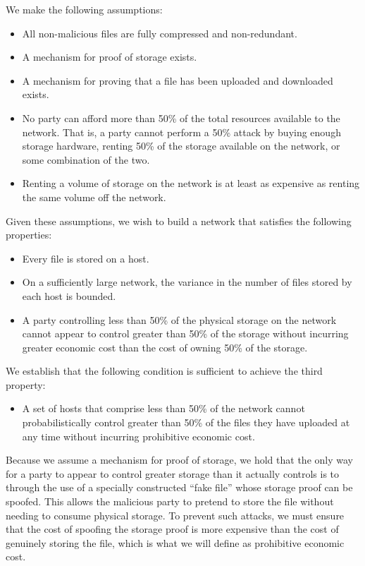 \documentclass[twocolumn]{article}
\begin{document}
We make the following assumptions:
\begin{itemize}
	\item All non-malicious files are fully compressed and non-redundant.
	\item A mechanism for proof of storage exists.
	\item A mechanism for proving that a file has been uploaded and downloaded exists.
	\item No party can afford more than 50\% of the total resources available to the network. That is, a party cannot perform a 50\% attack by buying enough storage hardware, renting 50\% of the storage available on the network, or some combination of the two.
	\item Renting a volume of storage on the network is at least as expensive as renting the same volume off the network.
\end{itemize}

Given these assumptions, we wish to build a network that satisfies the following properties:
\begin{itemize}
	\item Every file is stored on a host.
	\item On a sufficiently large network, the variance in the number of files stored by each host is bounded.
	\item A party controlling less than 50\% of the physical storage on the network cannot appear to control greater than 50\% of the storage without incurring greater economic cost than the cost of owning 50\% of the storage.
\end{itemize}

We establish that the following condition is sufficient to achieve the third property:
\begin{itemize}
	\item A set of hosts that comprise less than 50\% of the network cannot probabilistically control greater than 50\% of the files they have uploaded at any time without incurring prohibitive economic cost.
\end{itemize}
Because we assume a mechanism for proof of storage, we hold that the only way for a party to appear to control greater storage than it actually controls is to through the use of a specially constructed ``fake file'' whose storage proof can be spoofed.
This allows the malicious party to pretend to store the file without needing to consume physical storage.
To prevent such attacks, we must ensure that the cost of spoofing the storage proof is more expensive than the cost of genuinely storing the file, which is what we will define as prohibitive economic cost.
\end{document}
